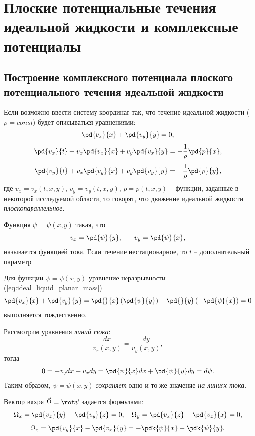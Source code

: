 \documentclass[a4paper, 14pt]{extarticle}
\begin{document}
	
	
\section{Плоские потенциальные течения идеальной жидкости и комплексные потенциалы}



\subsection{Построение комплексного потенциала плоского потенциального течения идеальной жидкости }

Если возможно ввести систему координат так, что течение идеальной жидкости ($\rho=const$) будет описываться уравнениями:	
\begin{equation}
	\label{eq:ideal_liquid_planar_mass}
	\pd{v_x}{x}+\pd{v_y}{y} = 0,
\end{equation}
\begin{equation}
	\label{eq:ideal_liquid_planar_momentum_x}
	\pd{v_x}{t}+v_x \pd{v_x}{x} + v_y \pd{v_x}{y} = -\frac{1}{\rho} \pd{p}{x},
\end{equation}	
\begin{equation}
	\label{eq:ideal_liquid_planar_momentum_y}
	\pd{v_y}{t}+v_x \pd{v_y}{x} + v_y \pd{v_y}{y} = -\frac{1}{\rho} \pd{p}{y},	
\end{equation}
где $v_x = v_x(t,x,y)$, $v_y = v_y(t,x,y)$, $p=p(t,x,y)$ -- функции, заданные в некоторой исследуемой области, то говорят, что движение идеальной жидкости \textit{плоскопараллельное}.

\begin{dfn}
	Функция $\psi=\psi(x,y)$ такая, что 
	\[
	v_x = \pd{\psi}{y},\quad
	-v_y = \pd{\psi}{x},
	\]
	называется функцией тока. Если течение нестационарное, то $t$ -- дополнительный параметр.
\end{dfn}

Для функции $\psi = \psi(x,y)$ уравнение неразрывности (\ref{eq:ideal_liquid_planar_mass})
\[
	\pd{v_x}{x} + \pd{v_y}{y} = 
	\pd{}{x} \left( \pd{\psi}{y} \right) + \pd{}{y} \left( -\pd{\psi}{x} \right) = 0
\]
выполняется тождественно.


Рассмотрим уравнения \textit{линий тока}:
\[
	\frac{dx}{v_x(x,y)} = \frac{dy}{v_y(x,y)},
\]
тогда
\[
0 = -v_y dx + v_x dy = \pd{\psi}{x} dx + \pd{\psi}{y} dy =  d\psi.
\]
Таким образом, $\psi=\psi(x,y)$ \textit{сохраняет} одно и то же значение \textit{на линиях тока}.
		
Вектор вихря $\vec{\Omega}= \rot \vec{v}$ задается формулами:
\[
	\Omega_x = \pd{v_z}{y}-\pd{v_y}{z} = 0,\quad
	\Omega_y = \pd{v_x}{z}-\pd{v_z}{x} = 0,
\]
\[
	\Omega_z = \pd{v_y}{x}-\pd{v_x}{y} = -\pdk{\psi}{x} - \pdk{\psi}{y}.
\]
		
\end{document}
